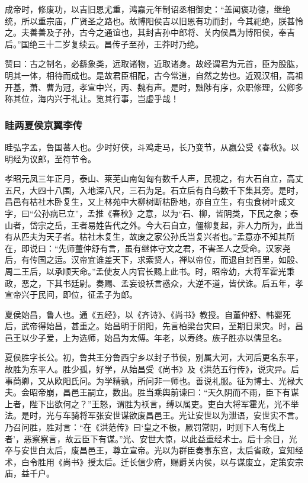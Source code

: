 \documentclass[]{article}
\begin{document}
成帝时，修废功，以吉旧恩尤重，鸿嘉元年制诏丞相御史：``盖闻褒功德，继绝统，所以重宗庙，广贤圣之路也。故博阳侯吉以旧恩有功而封，今其祀绝，朕甚怜之。夫善善及子孙，古今之通谊也，其封吉孙中郎将、关内侯昌为博阳侯，奉吉后。''国绝三十二岁复续云。昌传子至孙，王莽时乃绝。

赞曰：古之制名，必繇象类，远取诸物，近取诸身。故经谓君为元首，臣为股肱，明其一体，相待而成也。是故君臣相配，古今常道，自然之势也。近观汉相，高祖开基，萧、曹为冠，孝宣中兴，丙、魏有声。是时，黜陟有序，众职修理，公卿多称其位，海内兴于礼让。览其行事，岂虚乎哉！

\hypertarget{header-n5361}{%
\subsubsection{眭两夏侯京翼李传}\label{header-n5361}}

眭弘字孟，鲁国蕃人也。少时好侠，斗鸡走马，长乃变节，从嬴公受《春秋》。以明经为议郎，至符节令。

孝昭元凤三年正月，泰山、莱芜山南匈匈有数千人声，民视之，有大石自立，高丈五尺，大四十八围，入地深八尺，三石为足。石立后有白乌数千下集其旁。是时，昌邑有枯社木卧复生，又上林苑中大柳树断枯卧地，亦自立生，有虫食树叶成文字，曰``公孙病已立''，孟推《春秋》之意，以为``石、柳，皆阴类，下民之象；泰山者，岱宗之岳，王者易姓告代之外。今大石自立，僵柳复起，非人力所为，此当有从匹夫为天子者。枯社木复生，故废之家公孙氏当复兴者也。''孟意亦不知其所在，即说曰：``先师董仲舒有言，虽有继体守文之君，不害圣人之受命。汉家尧后，有传国之运。汉帝宜谁差天下，求索贤人，禅以帝位，而退自封百里，如殷、周二王后，以承顺天命。''孟使友人内官长赐上此书。时，昭帝幼，大将军霍光秉政，恶之，下其书廷尉。奏赐、孟妄设袄言惑众，大逆不道，皆伏诛。后五年，孝宣帝兴于民间，即位，征孟子为郎。

夏侯始昌，鲁人也。通《五经》，以《齐诗》、《尚书》教授。自董仲舒、韩婴死后，武帝得始昌，甚重之。始昌明于阴阳，先言柏梁台灾曰，至期日果灾。时，昌邑王以少子爱，上为选师，始昌为太傅。年老，以寿终。族子胜亦以儒显名。

夏侯胜字长公。初，鲁共王分鲁西宁乡以封子节侯，别属大河，大河后更名东平，故胜为东平人。胜少孤，好学，从始昌受《尚书》及《洪范五行传》，说灾异。后事蕳卿，又从欧阳氏问。为学精孰，所问非一师也。善说礼服。征为博士、光禄大夫。会昭帝崩，昌邑王嗣立，数出。胜当乘舆前谏曰：``天久阴而不雨，臣下有谋上者，陛下出欲何之？''王怒，谓胜为袄言，缚以属吏。吏白大将军霍光，光不举法。是时，光与车骑将军张安世谋欲废昌邑王。光让安世以为泄语，安世实不言。乃召问胜，胜对言：``在《洪范传》曰`皇之不极，厥罚常阴，时则下人有伐上者'，恶察察言，故云臣下有谋。''光、安世大惊，以此益重经术士。后十余日，光卒与安世白太后，废昌邑王，尊立宣帝。光以为群臣奏事东宫，太后省政，宜知经术，白令胜用《尚书》授太后。迁长信少府，赐爵关内侯，以与谋废立，定策安宗庙，益千户。
\end{document}

